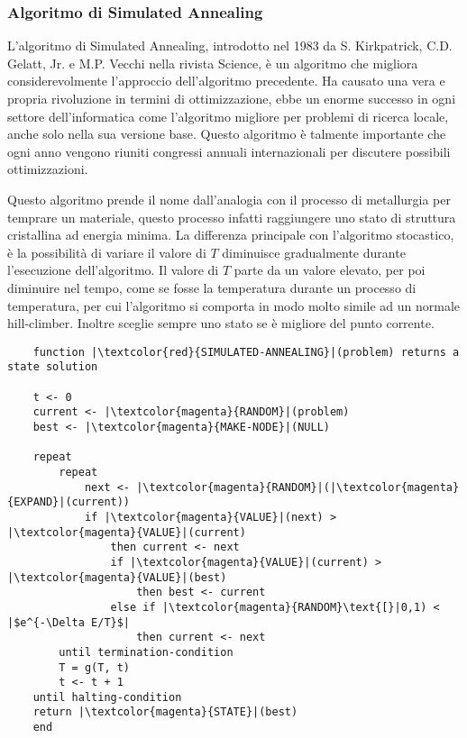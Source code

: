 \documentclass{article}
\numberwithin{equation}{subsection}
\begin{document}
\subsubsection{Algoritmo di Simulated Annealing}

L'algoritmo di Simulated Annealing, introdotto nel 1983 da S. Kirkpatrick, C.D. Gelatt, Jr. e M.P. Vecchi nella rivista Science, è un algoritmo che migliora 
considerevolmente l'approccio dell'algoritmo precedente. Ha causato una vera e propria rivoluzione in termini di ottimizzazione, ebbe un enorme successo in ogni 
settore dell'informatica come l'algoritmo migliore per problemi di ricerca locale, anche solo nella sua versione base.  
Questo algoritmo è talmente importante che ogni anno vengono riuniti congressi annuali internazionali per discutere possibili ottimizzazioni. 


Questo algoritmo prende il nome dall'analogia con il processo di metallurgia per temprare un materiale, questo processo infatti raggiungere uno stato di struttura 
cristallina ad energia minima. La differenza principale con l'algoritmo stocastico, è la possibilità di variare il valore di $T$ diminuisce gradualmente durante l'esecuzione 
dell'algoritmo. Il valore di $T$ parte da un valore elevato, per poi diminuire nel tempo, come se fosse la temperatura durante un processo di temperatura, per cui l'algoritmo si 
comporta in modo molto simile ad un normale hill-climber. Inoltre sceglie sempre uno stato 
se è migliore del punto corrente. 

\begin{verbatim}
    function |\textcolor{red}{SIMULATED-ANNEALING}|(problem) returns a state solution

    t <- 0
    current <- |\textcolor{magenta}{RANDOM}|(problem)
    best <- |\textcolor{magenta}{MAKE-NODE}|(NULL)

    repeat
        repeat
            next <- |\textcolor{magenta}{RANDOM}|(|\textcolor{magenta}{EXPAND}|(current))
            if |\textcolor{magenta}{VALUE}|(next) > |\textcolor{magenta}{VALUE}|(current) 
                then current <- next
                if |\textcolor{magenta}{VALUE}|(current) > |\textcolor{magenta}{VALUE}|(best)   
                    then best <- current
                else if |\textcolor{magenta}{RANDOM}\text{[}|0,1) < |$e^{-\Delta E/T}$| 
                    then current <- next
        until termination-condition
        T = g(T, t)
        t <- t + 1
    until halting-condition
    return |\textcolor{magenta}{STATE}|(best)
    end
\end{verbatim}
\end{document}
